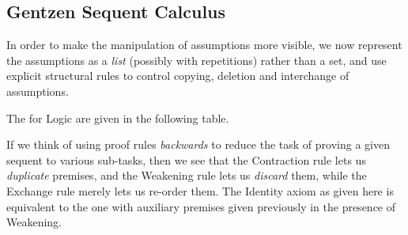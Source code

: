 \documentclass{svmult}
\begin{document}
\subsection{Gentzen Sequent Calculus}
In order to make the manipulation of assumptions more visible, we now represent the assumptions as a \emph{list} (possibly
with repetitions) rather than a set, and use explicit structural rules to control copying, deletion and interchange of assumptions.

\begin{mydefinition}\label{d:Struct} The  for Logic are given in the following table. \deq
\end{mydefinition}

\begin{center}\renewcommand{\arraystretch}{.5}
\end{center}
%
If we think of using proof rules \emph{backwards} to reduce the task of proving a given sequent to various sub-tasks, then we see that the Contraction rule lets us  \emph{duplicate} premises, and the Weakening rule lets us \emph{discard} them, while the Exchange rule merely lets us re-order them.
The Identity axiom as given here is equivalent to the one with auxiliary premises given previously in the presence of Weakening.
\end{document}
